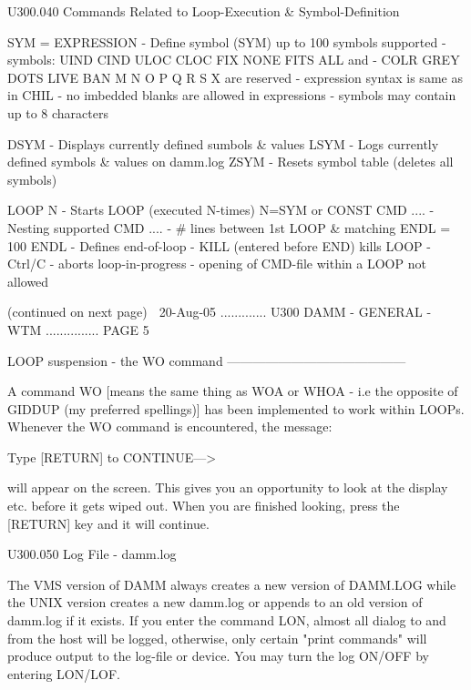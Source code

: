    U300.040  Commands Related to Loop-Execution & Symbol-Definition
 
   SYM = EXPRESSION - Define symbol (SYM) up to 100 symbols supported
                    - symbols: UIND CIND ULOC CLOC FIX NONE FITS ALL and
                    - COLR GREY DOTS LIVE BAN  M N O P Q R S X are reserved
                    - expression syntax is same as in CHIL
                    - no imbedded blanks are allowed in expressions
                    - symbols may contain up to 8 characters
 
   DSYM             - Displays currently defined sumbols & values
   LSYM             - Logs currently defined symbols & values on damm.log
   ZSYM             - Resets symbol table (deletes all symbols)
 
   LOOP N           - Starts LOOP (executed N-times) N=SYM or CONST
   CMD  ....        - Nesting supported
   CMD  ....        - # lines between 1st LOOP & matching ENDL = 100
   ENDL             - Defines end-of-loop
                    - KILL (entered before END) kills LOOP
                    - Ctrl/C    - aborts loop-in-progress
                    - opening of CMD-file within a LOOP not allowed
 
                            (continued on next page)
    
   20-Aug-05 ............. U300  DAMM - GENERAL - WTM ............... PAGE   5
 
   LOOP suspension - the WO command ------------------------------------------
 
   A command WO [means the same thing as WOA or WHOA -  i.e  the  opposite  of
   GIDDUP (my preferred spellings)] has been implemented to work within LOOPs.
   Whenever the WO command is encountered, the message:
 
   Type [RETURN] to CONTINUE--->
 
   will  appear  on  the  screen. This gives you an opportunity to look at the
   display etc. before it gets wiped  out.  When  you  are  finished  looking,
   press the [RETURN] key and it will continue.
 
   U300.050  Log File - damm.log
 
   The  VMS version of DAMM always creates a new version of DAMM.LOG while the
   UNIX version creates a new  damm.log  or  appends  to  an  old  version  of
   damm.log  if  it exists. If you enter the command LON, almost all dialog to
   and from the host will be logged, otherwise, only certain "print  commands"
   will  produce output to the log-file or device. You may turn the log ON/OFF
   by entering LON/LOF.
 
